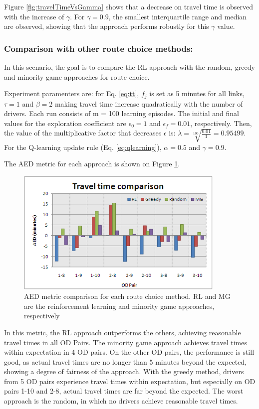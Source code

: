 \documentclass{RITA}
\newcommand{\fftt}{\ensuremath{f_j}} 		%
\begin{document}
Figure \ref{fig:travelTimeVsGamma} shows that a decrease on travel time is observed with the increase of $\gamma$. For $\gamma = 0.9$, the smallest interquartile range and median are observed, showing that the approach performs robustly for this $\gamma$ value.

\subsubsection{Comparison with other route choice methods:}
In this scenario, the goal is to compare the RL approach with the random, greedy and minority game approaches for route choice.

Experiment paramenters are: for Eq. \eqref{eq:tt}, $\fftt$ is set as 5 minutes for all links, $\tau = 1$ and $\beta = 2$ making travel time increase quadratically with the number of drivers. Each run consists of m = 100 learning episodes. The initial and final values for the exploration coefficient are $\epsilon_0 = 1$ and $\epsilon_f = 0.01$, respectively. Then, the value of the multiplicative factor that decreases $\epsilon$ is: $\lambda = \sqrt[100]{\frac{0.01}{1}} = 0.95499$. For the Q-learning update rule (Eq. \eqref{eq:qlearning}), $\alpha = 0.5$ and $\gamma = 0.9$.

The AED metric for each approach is shown on Figure \ref{fig:travelTimeComparison}. 

\begin{figure}[ht]
    \centerline{\includegraphics[width=10cm]{img/travelTimeComparison.png}}
    \caption{AED metric comparison for each route choice method. RL and MG are the reinforcement learning and minority game approaches, respectively}
    \label{fig:travelTimeComparison}
\end{figure}

In this metric, the RL approach outperforms the others, achieving reasonable travel times in all OD Pairs. The minority game approach achieves travel times within expectation in 4 OD pairs. On the other OD pairs, the performance is still good, as actual travel times are no longer than 5 minutes beyond the expected, showing a degree of fairness of the approach. With the greedy method, drivers from 5 OD pairs experience travel times within expectation, but especially on OD pairs 1-10 and 2-8, actual travel times are far beyond the expected. The worst approach is the random, in which no drivers achieve reasonable travel times.
\end{document}
